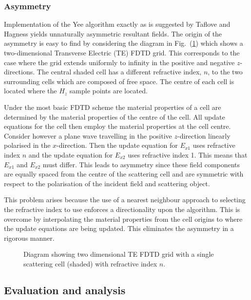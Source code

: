 \documentclass[a4paper, 12pt]{article}
\newcommand{\rfig}[1]{Fig.\ (\ref{#1})}
\begin{document}
	\subsubsection{Asymmetry}
	Implementation of the Yee algorithm exactly as is suggested by Taflove
	and Hagness \cite{taflove00book} yields unnaturally asymmetric
	resultant fields. The origin of the asymmetry is easy to find by
	considering the diagram in \rfig{fig:fdtd:2dasym} which shows a
	two-dimensional Transverse Electric (TE) FDTD grid. This corresponds
	to the case where the grid extends uniformly to infinity in the positive and
	negative $z$-directions. The central shaded cell has a different
	refractive index, $n$, to the two surrounding cells which are composed
	of free space. The centre of each cell
	is located where the $H_z$ sample points are located.

	Under the most basic FDTD scheme the material properties of a cell are
	determined by the material properties of the centre of the cell. All
	update equations for the cell then employ the material properties at
	the cell centre. Consider however a plane wave travelling in the
	positive $z$-direction linearly polarised in the $x$-direction. Then
	the update equation for $E_{x1}$ uses refractive index $n$ and the
	update equation for $E_{x2}$ uses refractive index 1. This means that
	$E_{x1}$ and $E_{x2}$ must differ. This leads to asymmetry since these
	field components are equally spaced from the centre of the scattering
	cell and are symmetric with respect to the polarisation of the
	incident field and scattering object.

	This problem arises because the use of a nearest neighbour approach to
	selecting the refractive index to use enforces a directionality upon
	the algorithm. This is overcome by interpolating the material
	properties from the cell origins to where the update equations are
	being updated. This eliminates the asymmetry in a rigorous manner.
	\begin{figure}[!h]
		\centering
		\caption{Diagram showing two dimensional TE FDTD grid with a single
			scattering cell (shaded) with refractive index $n$.}
		\label{fig:fdtd:2dasym}
	\end{figure}

	\subsection{Evaluation and analysis}
\end{document}
